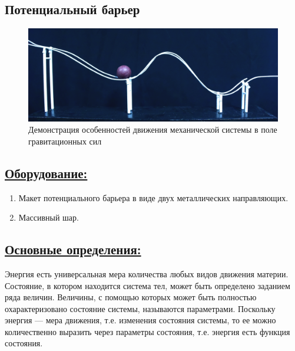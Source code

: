 \documentclass[14pt,a4paper,oneside]{extarticle}	%
\begin{document}
	

	\begin{center}
		\subsection*{Потенциальный барьер}
	\end{center}
		

\begin{figure}[H] 	
	\centering 	
	\includegraphics[width=0.9\linewidth]{barrier-1.png}
	\caption{Демонстрация особенностей движения механической системы в поле гравитационных сил}
	\label{barrier-1}
\end{figure}
	
	\subsection*{\underline{Оборудование:}}

		\begin{enumerate}
			\item Макет потенциального барьера в виде двух металлических направляющих.
			\item Массивный шар.
		\end{enumerate}
	
		\subsection*{\underline{Основные определения:}}
		
		Энергия есть универсальная мера количества любых видов движения материи.
		Состояние, в котором находится система тел, может быть определено заданием ряда величин.
		Величины, с помощью которых может быть полностью охарактеризовано состояние системы, называются параметрами.
		Поскольку энергия — мера движения, т.е. изменения состояния системы, то ее можно количественно выразить через параметры состояния, т.е. энергия есть функция состояния.
		
\end{document}
